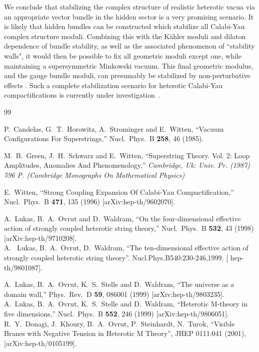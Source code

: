 \documentclass[12pt]{article}
\numberwithin{equation}{section}
\begin{document}
We conclude that stabilizing the complex structure of realistic heterotic vacua via an appropriate vector bundle in the hidden sector is a very promising scenario. It is likely that hidden bundles can be constructed which stabilize all Calabi-Yau complex structure moduli. Combining this with the K\"ahler moduli and dilaton dependence of bundle stability, as well as the associated phenomenon of ``stability walls", it would then be possible to fix all geometric moduli except one, while maintaining a supersymmetric Minkowski vacuum. This final geometric modulus, and the gauge bundle moduli, can presumably be stabilized by non-perturbative effects \cite{non-pert}. Such a complete stabilization scenario for heterotic Calabi-Yau compactifications is currently under investigation~\cite{scenario}.


\begin{thebibliography}{99}

  P.~Candelas, G.~T.~Horowitz, A.~Strominger and E.~Witten,
  ``Vacuum Configurations For Superstrings,''
  Nucl.\ Phys.\ B {\bf 258}, 46 (1985).

  M.~B.~Green, J.~H.~Schwarz and E.~Witten,
  ``Superstring Theory. Vol. 2: Loop Amplitudes, Anomalies And Phenomenology,''
{\it  Cambridge, Uk: Univ. Pr. (1987) 596 P. (Cambridge Monographs On Mathematical Physics)}

  E.~Witten,
  ``Strong Coupling Expansion Of Calabi-Yau Compactification,''
  Nucl.\ Phys.\  B {\bf 471}, 135 (1996)
  [arXiv:hep-th/9602070].
  
  A.~Lukas, B.~A.~Ovrut and D.~Waldram,
  ``On the four-dimensional effective action of strongly coupled heterotic string theory,''
  Nucl.\ Phys.\  B {\bf 532}, 43 (1998)
  [arXiv:hep-th/9710208]. \\
  A.~ Lukas, B.~A.~Ovrut, D.~Waldram, 
  ``The ten-dimensional effective action of strongly coupled heterotic string theory''.
  Nucl.Phys.B540:230-246,1999. 
[ hep-th/9801087].
  
 
  A.~Lukas, B.~A.~Ovrut, K.~S.~Stelle and D.~Waldram,
  ``The universe as a domain wall,''
  Phys.\ Rev.\  D {\bf 59}, 086001 (1999)
  [arXiv:hep-th/9803235]. \\
  A.~Lukas, B.~A.~Ovrut, K.~S.~Stelle and D.~Waldram,
  ``Heterotic M-theory in five dimensions,''
  Nucl.\ Phys.\  B {\bf 552}, 246 (1999)
  [arXiv:hep-th/9806051]. \\
  R.~Y.~Donagi, J.~Khoury, B.~A.~Ovrut, P.~Steinhardt, N.~Turok, 
  ``Visible Branes with Negative Tension in Heterotic M Theory'',
  JHEP 0111:041 (2001), [arXiv:hep-th/0105199]. 


\end{thebibliography}
\end{document}
